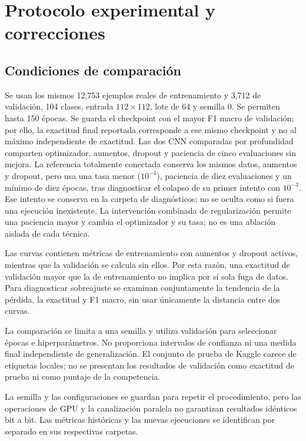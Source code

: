 \section{Protocolo experimental y correcciones}

\subsection{Condiciones de comparación}

Se usan los mismos 12,753 ejemplos reales de entrenamiento y 3,712 de validación,
104 clases, entrada $112\times112$, lote de 64 y semilla 0. Se permiten hasta 150
épocas. Se guarda el checkpoint con el mayor F1 macro de validación; por ello,
la exactitud final reportada corresponde a ese mismo checkpoint y no al máximo
independiente de exactitud. Las dos CNN comparadas por profundidad comparten
optimizador, aumentos, dropout y paciencia de cinco evaluaciones sin mejora.
La referencia totalmente conectada conserva los mismos datos, aumentos y dropout,
pero usa una tasa menor ($10^{-4}$), paciencia de diez evaluaciones y un mínimo
de diez épocas, tras diagnosticar el colapso de su primer intento con $10^{-3}$.
Ese intento se conserva en la carpeta de diagnósticos; no se oculta como si
fuera una ejecución inexistente. La intervención combinada de regularización
permite una paciencia mayor y cambia el optimizador y su tasa; no es una ablación
aislada de cada técnica.

Las curvas contienen métricas de entrenamiento con aumentos y dropout activos,
mientras que la validación se calcula sin ellos. Por esta razón, una exactitud
de validación mayor que la de entrenamiento no implica por sí sola fuga de datos.
Para diagnosticar sobreajuste se examinan conjuntamente la tendencia de la
pérdida, la exactitud y F1 macro, sin usar únicamente la distancia entre dos curvas.

La comparación se limita a una semilla y utiliza validación para seleccionar
épocas e hiperparámetros. No proporciona intervalos de confianza ni una medida
final independiente de generalización. El conjunto de prueba de Kaggle carece
de etiquetas locales; no se presentan los resultados de validación como
exactitud de prueba ni como puntaje de la competencia.

La semilla y las configuraciones se guardan para repetir el procedimiento, pero
las operaciones de GPU y la canalización paralela no garantizan resultados
idénticos bit a bit. Las métricas históricas y las nuevas ejecuciones se identifican
por separado en sus respectivas carpetas.

